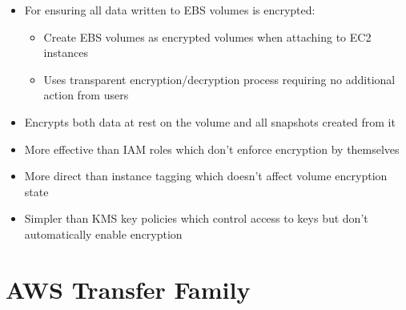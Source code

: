 \documentclass[11pt,a4paper]{report}
\begin{document}
\begin{itemize}
\begin{itemize}
  \item For ensuring all data written to EBS volumes is encrypted:
\begin{itemize}
  \item Create EBS volumes as encrypted volumes when attaching to EC2 instances
  \item Uses transparent encryption/decryption process requiring no additional action from users
\end{itemize}
  \item Encrypts both data at rest on the volume and all snapshots created from it
  \item More effective than IAM roles which don't enforce encryption by themselves
  \item More direct than instance tagging which doesn't affect volume encryption state
  \item Simpler than KMS key policies which control access to keys but don't automatically enable encryption
\end{itemize}
\end{itemize}

\section{AWS Transfer Family}
\end{document}
